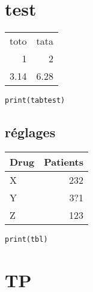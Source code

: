 \documentclass[11pt]{article}
\author{maint}
\date{\today}
\title{}
\begin{document}
\tableofcontents

\section{test}
\label{sec:orgdf9ec41}

\begin{table}[htbp]
\label{tabtest}
\centering
\begin{tabular}{rr}
toto & tata\\
1 & 2\\
3.14 & 6.28\\
\end{tabular}
\end{table}


\begin{verbatim}
print(tabtest)
\end{verbatim}


\subsection{réglages}
\label{sec:org857ee25}


\begin{table}[htbp]
\label{mydata}
\centering
\begin{tabular}{lr}
Drug & Patients\\
\hline
X & 232\\
Y & 3?1\\
Z & 123\\
\end{tabular}
\end{table}

\begin{verbatim}
print(tbl)
\end{verbatim}



\section{TP}
\label{sec:org316f71a}
\end{document}
